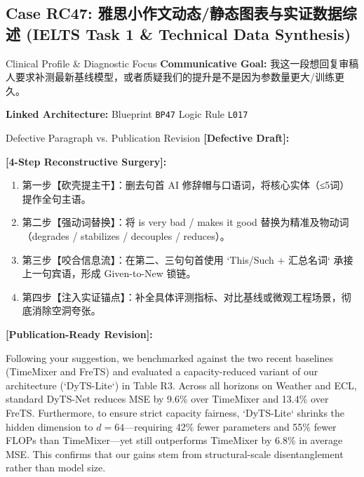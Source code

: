 \subsection{Case RC47: 雅思小作文动态/静态图表与实证数据综述 (IELTS Task 1 \& Technical Data Synthesis)}\label{case:RC47}
\begin{ConceptBox}{Clinical Profile \& Diagnostic Focus}
\textbf{Communicative Goal:} 我这一段想回复审稿人要求补测最新基线模型，或者质疑我们的提升是不是因为参数量更大/训练更久。\par
\textbf{Linked Architecture:} Blueprint \texttt{BP47} \enspace\textbar\enspace Logic Rule \texttt{L017}
\end{ConceptBox}
\begin{ExampleBox}{Defective Paragraph vs. Publication Revision}
\textbf{\color{TargetHighlight}[Defective Draft]:}\par
{}\par\vspace{6pt}
\textbf{\color{AcadForest}[4-Step Reconstructive Surgery]:}
\begin{enumerate}[label=\textbf{\color{AcadNavy}Step \arabic*:}, leftmargin=2em]
  \item 第一步【砍壳提主干】：删去句首 AI 修辞帽与口语词，将核心实体（≤5词）提作全句主语。
  \item 第二步【强动词替换】：将 is very bad / makes it good 替换为精准及物动词（degrades / stabilizes / decouples / reduces）。
  \item 第三步【咬合信息流】：在第二、三句句首使用 `This/Such + 汇总名词` 承接上一句宾语，形成 Given-to-New 锁链。
  \item 第四步【注入实证锚点】：补全具体评测指标、对比基线或微观工程场景，彻底消除空洞夸张。
\end{enumerate}\vspace{4pt}
\textbf{\color{AcadNavy}[Publication-Ready Revision]:}\par
Following your suggestion, we benchmarked against the two recent baselines (TimeMixer and FreTS) and evaluated a capacity-reduced variant of our architecture (`DyTS-Lite`) in Table R3. Across all horizons on Weather and ECL, standard DyTS-Net reduces MSE by 9.6\% over TimeMixer and 13.4\% over FreTS. Furthermore, to ensure strict capacity fairness, `DyTS-Lite` shrinks the hidden dimension to $d=64$---requiring 42\% fewer parameters and 55\% fewer FLOPs than TimeMixer---yet still outperforms TimeMixer by 6.8\% in average MSE. This confirms that our gains stem from structural-scale disentanglement rather than model size.
\end{ExampleBox}
